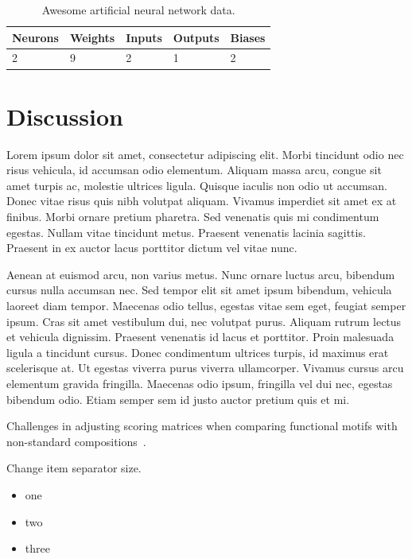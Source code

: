 \documentclass[twocolumn]{miniclass}
\begin{document}
\begin{table}[tbp]
    \centering
    \begin{tabular}{|l|l|l|l|l|}
        \hline
        Neurons & Weights & Inputs & Outputs & Biases \\ \hline
        2              & 9       & 2      & 1       & 2      \\ \hline
    \end{tabular}
    \caption{Awesome artificial neural network data.}
    \label{tab:ann_arch}
\end{table}

\section{Discussion}
Lorem ipsum dolor sit amet, consectetur adipiscing elit. Morbi tincidunt odio nec risus vehicula, id accumsan odio elementum. Aliquam massa arcu, congue sit amet turpis ac, molestie ultrices ligula. Quisque iaculis non odio ut accumsan. Donec vitae risus quis nibh volutpat aliquam. Vivamus imperdiet sit amet ex at finibus. Morbi ornare pretium pharetra. Sed venenatis quis mi condimentum egestas. Nullam vitae tincidunt metus. Praesent venenatis lacinia sagittis. Praesent in ex auctor lacus porttitor dictum vel vitae nunc.

Aenean at euismod arcu, non varius metus. Nunc ornare luctus arcu, bibendum cursus nulla accumsan nec. Sed tempor elit sit amet ipsum bibendum, vehicula laoreet diam tempor. Maecenas odio tellus, egestas vitae sem eget, feugiat semper ipsum. Cras sit amet vestibulum dui, nec volutpat purus. Aliquam rutrum lectus et vehicula dignissim. Praesent venenatis id lacus et porttitor. Proin malesuada ligula a tincidunt cursus. Donec condimentum ultrices turpis, id maximus erat scelerisque at. Ut egestas viverra purus viverra ullamcorper. Vivamus cursus arcu elementum gravida fringilla. Maecenas odio ipsum, fringilla vel dui nec, egestas bibendum odio. Etiam semper sem id justo auctor pretium quis et mi.

Challenges in adjusting scoring matrices when comparing functional motifs with non-standard compositions~\cite{jarnot2024challenges}.

Change item separator size.
\vspace{-3mm}
\begin{itemize}
  \setlength\itemsep{0.0em}
  \item one
  \item two
  \item three
\end{itemize}



\end{document}
